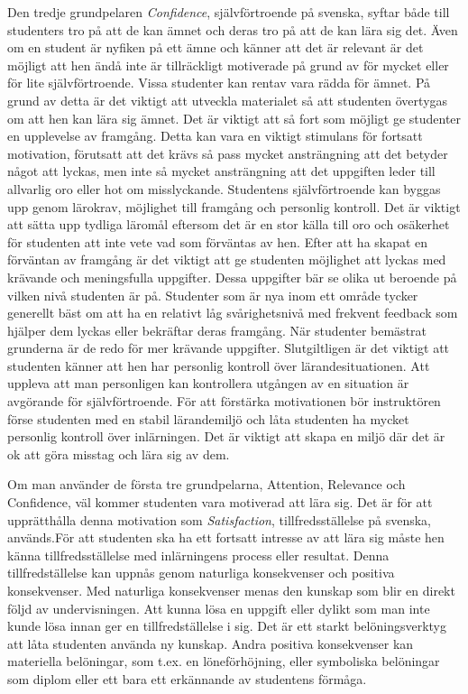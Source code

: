 \documentclass[]{article}
\begin{document}
Den tredje grundpelaren \textit{Confidence}, självförtroende på svenska, syftar både till studenters tro på att de 
kan ämnet och deras tro på att de kan lära sig det. Även om en student är nyfiken på ett ämne och känner 
att det är relevant är det möjligt att hen ändå inte är tillräckligt motiverade på grund av för mycket 
eller för lite självförtroende. Vissa studenter kan rentav vara rädda för ämnet. På grund av detta är det 
viktigt att utveckla materialet så att studenten övertygas om att hen kan lära sig ämnet. Det är viktigt 
att så fort som möjligt ge studenter en upplevelse av framgång. Detta kan vara en viktigt stimulans för 
fortsatt motivation, förutsatt att det krävs så pass mycket ansträngning att det betyder något att lyckas, 
men inte så mycket ansträngning att det uppgiften leder till allvarlig oro eller hot om misslyckande. 
Studentens självförtroende kan byggas upp genom lärokrav, möjlighet till framgång och personlig kontroll. 
Det är viktigt att sätta upp tydliga läromål eftersom det är en stor källa till oro och osäkerhet för 
studenten att inte vete vad som förväntas av hen. Efter att ha skapat en förväntan av framgång är det 
viktigt att ge studenten möjlighet att lyckas med krävande och meningsfulla uppgifter. Dessa uppgifter 
bär se olika ut beroende på vilken nivå studenten är på. Studenter som är nya inom ett område tycker 
generellt bäst om att ha en relativt låg svårighetsnivå med frekvent feedback som hjälper dem lyckas 
eller bekräftar deras framgång. När studenter bemästrat grunderna är de redo för mer krävande uppgifter. 
Slutgiltligen är det viktigt att studenten känner att hen har personlig kontroll över lärandesituationen. 
Att uppleva att man personligen kan kontrollera utgången av en situation är avgörande för självförtroende. 
För att förstärka motivationen bör instruktören förse studenten med en stabil lärandemiljö och låta 
studenten ha mycket personlig kontroll över inlärningen. Det är viktigt att skapa en miljö där det är ok 
att göra misstag och lära sig av dem.

Om man använder de första tre grundpelarna, Attention, Relevance och Confidence, väl kommer studenten vara 
motiverad att lära sig. Det är för att upprätthålla denna motivation som \textit{Satisfaction}, tillfredsställelse 
på svenska, används.För att studenten ska ha ett fortsatt intresse av att lära sig måste hen känna 
tillfredsställelse med inlärningens process eller resultat. Denna tillfredställelse kan uppnås genom 
naturliga konsekvenser och positiva konsekvenser. Med naturliga konsekvenser menas den kunskap som blir 
en direkt följd av undervisningen. Att kunna lösa en uppgift eller dylikt som man inte kunde lösa innan 
ger en tillfredställelse i sig. Det är ett starkt belöningsverktyg att låta studenten använda ny kunskap. 
Andra positiva konsekvenser kan materiella belöningar, som t.ex. en löneförhöjning,  eller symboliska 
belöningar som diplom eller ett bara ett erkännande av studentens förmåga.
\end{document}
